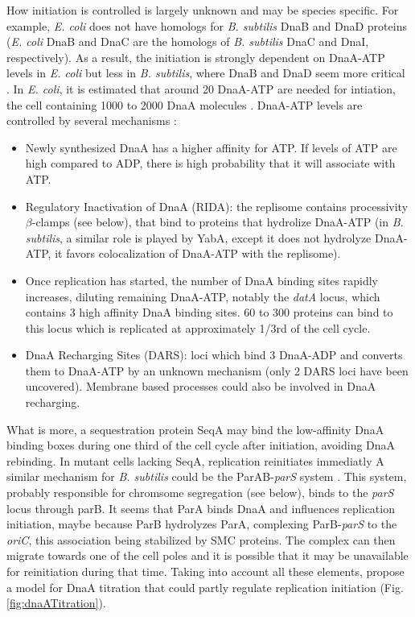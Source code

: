 How initiation is controlled is largely unknown and may be species specific. For example, \textit{E. coli} does not have homologs for \textit{B. subtilis} DnaB and DnaD proteins (\textit{E. coli} DnaB and DnaC are the homologs of \textit{B. subtilis} DnaC and DnaI, respectively). As a result, the initiation is strongly dependent on DnaA-ATP levels in \textit{E. coli} but less in \textit{B. subtilis}, where DnaB and DnaD seem more critical \citep{briggs_chromosomal_2012}. In \textit{E. coli}, it is estimated that around 20 DnaA-ATP are needed for intiation, the cell containing 1000 to 2000 DnaA molecules \citep{leonard_regulation_2011}. DnaA-ATP levels are controlled by several mechanisms \citep{leonard_regulation_2011}:
\begin{itemize}
	\item Newly synthesized DnaA has a higher affinity for ATP. If levels of ATP are high compared to ADP, there is high probability that it will associate with ATP.
	\item Regulatory Inactivation of DnaA (RIDA): the replisome contains processivity $\beta$-clamps (see below), that bind to proteins that hydrolize DnaA-ATP (in \textit{B. subtilis}, a similar role is played by YabA, except it does not hydrolyze DnaA-ATP, it favors colocalization of DnaA-ATP with the replisome).
	\item Once replication has started, the number of DnaA binding sites rapidly increases, diluting remaining DnaA-ATP, notably the \textit{datA} locus, which contains 3 high affinity DnaA binding sites. 60 to 300 proteins can bind to this locus which is replicated at approximately 1/3rd of the cell cycle.
	\item DnaA Recharging Sites (DARS): loci which bind 3 DnaA-ADP and converts them to DnaA-ATP by an unknown mechanism (only 2 DARS loci have been uncovered). Membrane based processes could also be involved in DnaA recharging.
\end{itemize}
What is more, a sequestration protein SeqA may bind the low-affinity DnaA binding boxes during one third of the cell cycle after initiation, avoiding DnaA rebinding. In mutant cells lacking SeqA, replication reinitiates immediatly \citep{leonard_regulation_2011} A similar mechanism for \textit{B. subtilis} could be the ParAB-\textit{parS} system \citep{reyes-lamothe_chromosome_2012}. This system, probably responsible for chromsome segregation (see below), binds to the \textit{parS} locus through parB. It seems that ParA binds DnaA and influences replication initiation, maybe because ParB hydrolyzes ParA, complexing ParB-\textit{parS} to the \textit{oriC}, this association being stabilized by SMC proteins. The complex can then migrate towards one of the cell poles and it is possible that it may be unavailable for reinitiation during that time. Taking into account all these elements, \citet{leonard_regulation_2011} propose a model for DnaA titration that could partly regulate replication initiation (Fig. \ref{fig:dnaATitration}).

